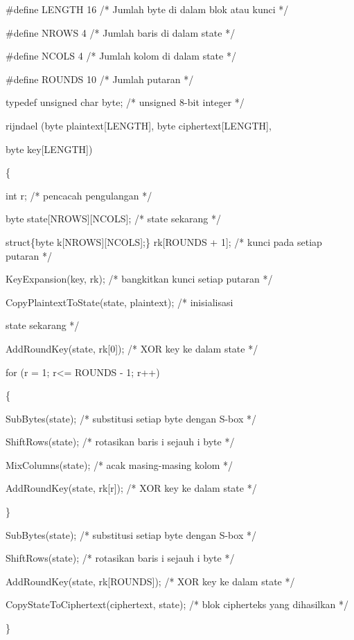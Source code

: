 \documentclass{article}
\begin{document}

\#define LENGTH 16            /* Jumlah byte di dalam blok atau kunci */ 

\#define NROWS 4              /* Jumlah baris di dalam state */ 

\#define NCOLS 4              /* Jumlah kolom di dalam state */ 

\#define ROUNDS 10            /* Jumlah putaran */ 

typedef unsigned char byte;  /* unsigned 8-bit integer */ 


rijndael (byte plaintext[LENGTH], byte ciphertext[LENGTH],  

          byte key[LENGTH]) 

\{ 

 int r;                     /* pencacah pengulangan */ 

 byte state[NROWS][NCOLS];  /* state sekarang */ 

 struct\{byte k[NROWS][NCOLS];\} rk[ROUNDS + 1];  /* kunci pada setiap putaran */ 


 KeyExpansion(key, rk);       /* bangkitkan kunci setiap putaran */ 

 CopyPlaintextToState(state, plaintext);  /* inisialisasi 

                                             state sekarang */ 

 AddRoundKey(state, rk[0]);  /* XOR key ke dalam state */ 


 for (r = 1; r<= ROUNDS - 1; r++) 

 \{ 

  SubBytes(state);        /* substitusi setiap byte dengan S-box */  

  ShiftRows(state);       /* rotasikan baris i sejauh i byte */   

  MixColumns(state);      /* acak masing-masing kolom */ 

  AddRoundKey(state, rk[r]);   /* XOR key ke dalam state */ 

 \} 

 SubBytes(state);        /* substitusi setiap byte dengan S-box */  

 ShiftRows(state);       /* rotasikan baris i sejauh i byte */   

 AddRoundKey(state, rk[ROUNDS]);   /* XOR key ke dalam state */ 


 CopyStateToCiphertext(ciphertext, state);  /* blok cipherteks yang dihasilkan */  


\}
\end{document}
